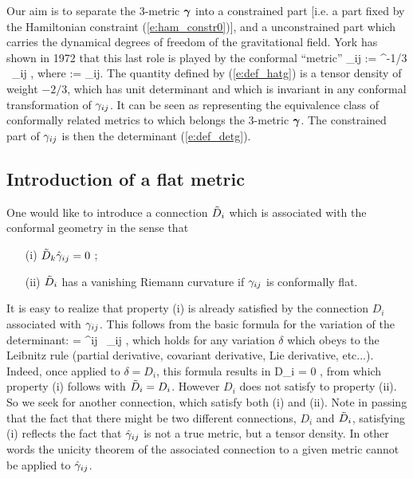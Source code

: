Our aim is to separate the 3-metric $\mbox{\boldmath ${\gamma}$}$ into a constrained
part [i.e. a part fixed by the Hamiltonian constraint (\ref{e:ham_constr0})],
and a unconstrained part which carries the dynamical degrees of freedom
of the gravitational field. York \cite{York72} has shown in 1972 
that this last role is played by the conformal ``metric''
\be \label{e:def_hatg}
	\hat \gm_{ij} := \gm^{-1/3} \, \gm_{ij} ,
\ee 
where
\be \label{e:def_detg}
	\gm := \det\gm_{ij}.
\ee
The quantity defined by (\ref{e:def_hatg}) is a tensor density of
weight $-2/3$, which has unit determinant and which is invariant in
any conformal transformation of $\gamma_{ij}$. It can be seen as
representing the equivalence class of conformally related metrics
to which belongs the 3-metric $\mbox{\boldmath ${\gamma}$}$. 
The constrained part of $\gamma_{ij}$ is then
the determinant (\ref{e:def_detg}).

\subsection{Introduction of a flat metric}

One would like to introduce a connection $\tilde D_i$ which is associated
with the conformal geometry in the sense that 
\begin{itemize}
\item[(i)] $\tilde D_k \hat {\gamma}_{ij} = 0$ ;
\item[(ii)] $\tilde D_i$ has a vanishing Riemann curvature if $\gamma_{ij}$
is conformally flat.
\end{itemize}
It is easy to realize that property (i) is already 
satisfied by the connection $D_i$ associated with $\gamma_{ij}$. This
follows from the basic formula for the variation of the determinant:
\be \label{e:variation_gm}
	\delta \ln\gm = \gm^{ij} \, \delta \gm_{ij} ,
\ee
which holds for any variation $\delta$ which obeys to the Leibnitz rule
(partial derivative, covariant derivative, Lie derivative, etc...).
Indeed, once applied to $\delta=D_i$, this formula results in
\be \label{e:nab_gm_zero}
	D_i \gm = 0 ,
\ee
from which property (i) follows with $\tilde D_i = D_i$. However $D_i$
does not satisfy to property (ii). So we seek for another connection,
which satisfy both (i) and (ii). Note in passing that the fact that
there might be two different connections, $D_i$ and $\tilde D_i$, satisfying
(i) reflects the fact that $\hat{\gamma}_{ij}$ is not a true metric,
but a tensor density. In other words the unicity theorem of the 
associated connection to a given metric cannot be applied to $\hat{\gamma}_{ij}$.

